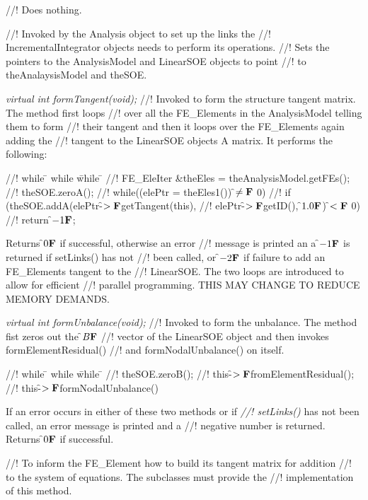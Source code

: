//! Does nothing.

//! Invoked by the Analysis object to set up the links the
//! IncrementalIntegrator objects needs to perform its operations.
//! Sets the pointers to the AnalysisModel and LinearSOE objects to point
//! to \p theAnalaysisModel and \p theSOE.

{\em virtual int formTangent(void);}
//! Invoked to form the structure tangent matrix. The method first loops
//! over all the FE\_Elements in the AnalysisModel telling them to form
//! their tangent and then it loops over the FE\_Elements again adding the
//! tangent to the LinearSOE objects A matrix. It performs the following:
\begin{tabbing}
//! while \= \+ while \= while \= \kill
//! FE\_EleIter \&theEles = theAnalysisModel.getFEs();
//! theSOE.zeroA();
//! while((elePtr = theEles1()) \f$\neq{\bf F}$ 0) \+
//! if (theSOE.addA(elePtr-\f$>{\bf F}$getTangent(this),
//! elePtr-\f$>{\bf F}$getID(), \f$1.0{\bf F}$) \f$<{\bf F}$ 0) \+
//! return \f$-1{\bf F}$; \-\- 
\end{tabbing}
\noindent Returns \f$0{\bf F}$ if successful, otherwise an error
//! message is printed an a \f$-1{\bf F}$ is returned if setLinks() has not
//! been called, or \f$-2{\bf F}$ if failure to add an FE\_Elements tangent to the
//! LinearSOE. The two loops are introduced to allow for efficient
//! parallel programming. THIS MAY CHANGE TO REDUCE MEMORY DEMANDS.  

{\em virtual int formUnbalance(void);}
//! Invoked to form the unbalance. The method fist zeros out the \f$B{\bf F}$
//! vector of the LinearSOE object and then invokes formElementResidual()
//! and formNodalUnbalance() on itself.
\begin{tabbing}
//! while \= \+ while \= while \= \kill
//! theSOE.zeroB();
//! this-\f$>{\bf F}$fromElementResidual();
//! this-\f$>{\bf F}$formNodalUnbalance()
\end{tabbing}

\noindent If an error occurs in either of these two methods or if {\em
//! setLinks()} has not been called, an error message is printed and a
//! negative number is returned. Returns \f$0{\bf F}$ if successful. 


//! To inform the FE\_Element how to build its tangent matrix for addition
//! to the system of equations. The subclasses must provide the
//! implementation of this method.

